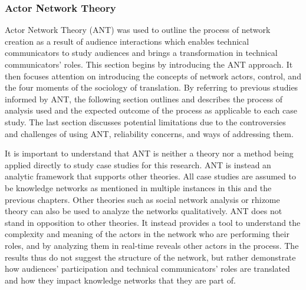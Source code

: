 \subsubsection{Actor Network Theory}
Actor Network Theory (ANT) was used to outline the process of network creation as a result of audience interactions which enables technical communicators to study audiences and brings a transformation in technical communicators' roles. This section begins by introducing the ANT approach. It then focuses attention on introducing the concepts of network actors, control, and the four moments of the sociology of translation. By referring to previous studies informed by ANT, the following section outlines and describes the process of analysis used and the expected outcome of the process as applicable to each case study. The last section discusses potential limitations due to the controversies and challenges of using ANT, reliability concerns, and ways of addressing them.

It is important to understand that ANT is neither a theory nor a method being applied directly to study case studies for this research. ANT is instead an analytic framework that supports other theories. All case studies are assumed to be knowledge networks as mentioned in multiple instances in this and the previous chapters. Other theories such as social network analysis \cite{grandjean2016social, freeman2004development} or rhizome theory \cite{felix1987thousand, honan2007writing, clarke2013becoming} can also be used to analyze the networks qualitatively. ANT does not stand in opposition to other theories. It instead provides a tool to understand the complexity and meaning of the actors in the network who are performing their roles, and by analyzing them in real-time reveals other actors in the process. The results thus do not suggest the structure of the network, but rather demonstrate how audiences' participation and technical communicators' roles are translated and how they impact knowledge networks that they are part of.

